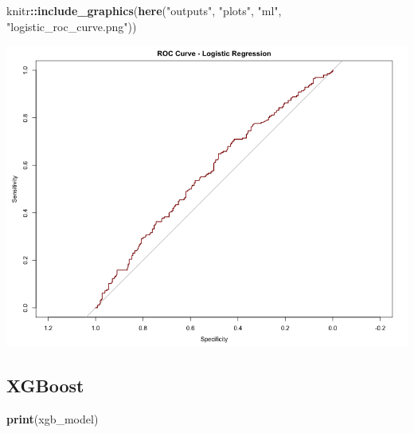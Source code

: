 \documentclass[
  11pt,
]{article}
\newenvironment{Shaded}{\begin{snugshade}}{\end{snugshade}}
\newcommand{\FunctionTok}[1]{\textcolor[rgb]{0.13,0.29,0.53}{\textbf{#1}}}
\newcommand{\NormalTok}[1]{#1}
\newcommand{\SpecialCharTok}[1]{\textcolor[rgb]{0.81,0.36,0.00}{\textbf{#1}}}
\newcommand{\StringTok}[1]{\textcolor[rgb]{0.31,0.60,0.02}{#1}}
\begin{document}
\begin{Shaded}
\begin{Highlighting}[]
\NormalTok{knitr}\SpecialCharTok{::}\FunctionTok{include\_graphics}\NormalTok{(}\FunctionTok{here}\NormalTok{(}\StringTok{"outputs"}\NormalTok{, }\StringTok{"plots"}\NormalTok{, }\StringTok{"ml"}\NormalTok{, }\StringTok{"logistic\_roc\_curve.png"}\NormalTok{))}
\end{Highlighting}
\end{Shaded}

\includegraphics[width=0.8\linewidth]{../outputs/plots/ml/logistic_roc_curve}

\subsection{XGBoost}\label{xgboost}

\begin{Shaded}
\begin{Highlighting}[]
\FunctionTok{print}\NormalTok{(xgb\_model)}
\end{Highlighting}
\end{Shaded}
\end{document}
